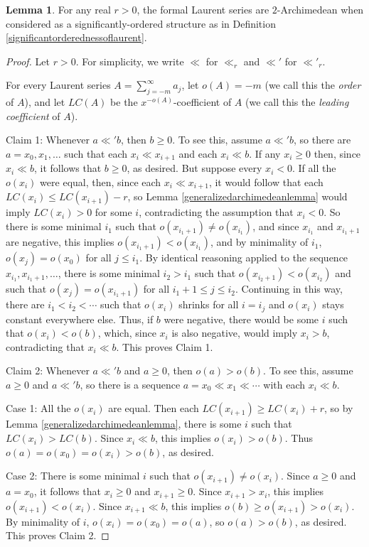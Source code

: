 \documentclass[reqno]{article}
\theoremstyle{definition}
\newtheorem{lemma}[theorem]{Lemma}
\begin{document}
\begin{lemma}
For any real $r>0$,
the formal Laurent series are $2$-Archimedean when considered as a
significantly-ordered structure as in Definition \ref{significantorderednessoflaurent}.
\end{lemma}

\begin{proof}
Let $r>0$. For simplicity, we write $\ll$ for $\ll_r$ and $\ll'$ for
$\ll'_r$.

For every Laurent series $A=\sum_{j=-m}^\infty a_j$, let $o(A)=-m$ (we call this the
\emph{order} of $A$), and let $LC(A)$ be the $x^{-o(A)}$-coefficient of $A$ (we call
this the \emph{leading coefficient} of $A$).

Claim 1: Whenever $a\ll' b$, then $b\geq 0$.
To see this, assume $a\ll' b$, so there are $a=x_0,x_1,\ldots$ such that each
$x_i\ll x_{i+1}$ and each $x_i\ll b$.
If any $x_i\geq 0$ then, since $x_i\ll b$, it follows that $b\geq 0$, as desired.
But suppose every $x_i<0$.
If all the $o(x_i)$ were equal, then, since each
$x_i\ll x_{i+1}$, it would follow that each $LC(x_{i})\leq LC(x_{i+1})-r$, so Lemma
\ref{generalizedarchimedeanlemma} would imply $LC(x_i)>0$ for some $i$, contradicting
the assumption that $x_i<0$. So there is some minimal $i_1$ such
that $o(x_{i_1+1})\not=o(x_{i_1})$,
and since $x_{i_1}$ and $x_{i_1+1}$ are negative, this implies
$o(x_{i_1+1})<o(x_{i_1})$, and by minimality of $i_1$, $o(x_j)=o(x_0)$ for all
$j\leq i_1$.
By identical reasoning applied to the sequence $x_{i_1},x_{i_1+1},\ldots$,
there is some minimal $i_2>i_1$ such that $o(x_{i_2+1})<o(x_{i_2})$
and such that $o(x_j)=o(x_{i_1+1})$ for all $i_1+1\leq j\leq i_2$.
Continuing in this way, there are $i_1<i_2<\cdots$ such that $o(x_i)$ shrinks
for all $i=i_j$ and $o(x_i)$ stays constant everywhere else. Thus, if $b$ were negative,
there would be some $i$ such that $o(x_i)<o(b)$, which, since $x_i$ is also negative,
would imply $x_i>b$, contradicting that $x_i\ll b$. This proves Claim 1.

Claim 2: Whenever $a\ll' b$ and $a\geq 0$, then $o(a)>o(b)$.
To see this, assume $a\geq 0$ and $a\ll' b$, so there is a sequence
$a=x_0\ll x_1\ll\cdots$ with each $x_i\ll b$.

Case 1: All the $o(x_i)$ are equal. Then each $LC(x_{i+1})\geq LC(x_i)+r$, so by Lemma
\ref{generalizedarchimedeanlemma}, there is some $i$ such that $LC(x_i)>LC(b)$.
Since $x_i\ll b$, this implies $o(x_i)>o(b)$. Thus $o(a)=o(x_0)=o(x_i)>o(b)$, as desired.

Case 2: There is some minimal $i$ such that $o(x_{i+1})\not=o(x_{i})$.
Since $a\geq 0$ and $a=x_0$, it follows that $x_i\geq 0$ and $x_{i+1}\geq 0$. Since
$x_{i+1}>x_{i}$, this implies $o(x_{i+1})<o(x_{i})$.
Since $x_{i+1}\ll b$, this implies $o(b)\geq o(x_{i+1})>o(x_i)$.
By minimality of $i$, $o(x_i)=o(x_0)=o(a)$, so $o(a)>o(b)$, as desired. This proves Claim 2.


\end{proof}
\end{document}
